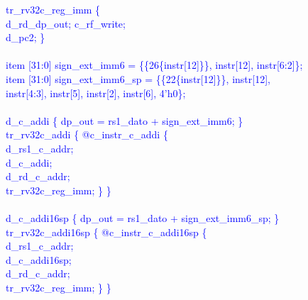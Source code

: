\textcolor{blue}{
\indent tr\_rv32c\_reg\_imm \{\\%
\indent \hspace{\parindent} d\_rd\_dp\_out; c\_rf\_write;  \\%
\indent \hspace{\parindent} d\_pc2; \}\\%
\\
\indent item [31:0] sign\_ext\_imm6 = \{\{26\{instr[12]\}\}, instr[12], instr[6:2]\};\\%
\indent item [31:0] sign\_ext\_imm6\_sp = \{\{22\{instr[12]\}\}, instr[12],\\%
\indent \hspace{\parindent} \hspace{\parindent} \hspace{\parindent} instr[4:3], instr[5], instr[2], instr[6], 4'h0\};\\%
\\
\indent d\_c\_addi \{ dp\_out = rs1\_dato + sign\_ext\_imm6; \}\\%
\indent tr\_rv32c\_addi \{ @c\_instr\_c\_addi \{\\%
\indent \hspace{\parindent} d\_rs1\_c\_addr; \\%
\indent \hspace{\parindent} d\_c\_addi; \\%
\indent \hspace{\parindent} d\_rd\_c\_addr;\\%
\indent \hspace{\parindent} tr\_rv32c\_reg\_imm; \} \} \\%
\\
\indent d\_c\_addi16sp \{ dp\_out = rs1\_dato + sign\_ext\_imm6\_sp; \}\\%
\indent tr\_rv32c\_addi16sp \{ @c\_instr\_c\_addi16sp \{ \\%
\indent \hspace{\parindent} d\_rs1\_c\_addr; \\%
\indent \hspace{\parindent} d\_c\_addi16sp; \\%
\indent \hspace{\parindent} d\_rd\_c\_addr;\\%
\indent \hspace{\parindent} tr\_rv32c\_reg\_imm; \} \} \\%
}


